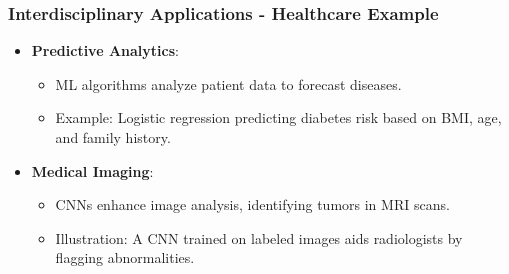 \documentclass[aspectratio=169]{beamer}
\begin{document}
\begin{frame}[fragile]
    \frametitle{Interdisciplinary Applications - Healthcare Example}
    \begin{itemize}
        \item \textbf{Predictive Analytics}:
            \begin{itemize}
                \item ML algorithms analyze patient data to forecast diseases.
                \item Example: Logistic regression predicting diabetes risk based on BMI, age, and family history.
            \end{itemize}
        \item \textbf{Medical Imaging}:
            \begin{itemize}
                \item CNNs enhance image analysis, identifying tumors in MRI scans.
                \item Illustration: A CNN trained on labeled images aids radiologists by flagging abnormalities.
            \end{itemize}
    \end{itemize}
\end{frame}
\end{document}
